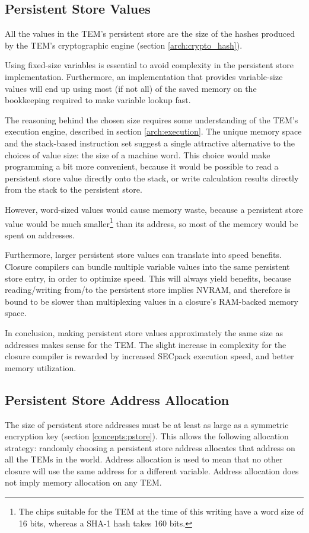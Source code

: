 \subsection{Persistent Store Values}
All the values in the TEM's persistent store are the size of the hashes
produced by the TEM's cryptographic engine (section \ref{arch:crypto_hash}).

Using fixed-size variables is essential to avoid complexity in the persistent
store implementation. Furthermore, an implementation that provides
variable-size values will end up using most (if not all) of the saved memory on
the bookkeeping required to make variable lookup fast.

The reasoning behind the chosen size requires some understanding of the TEM's
execution engine, described in section \ref{arch:execution}. The unique memory
space and the stack-based instruction set suggest a single attractive
alternative to the choices of value size: the size of a machine word. This
choice would make programming a bit more convenient, because it would be
possible to read a persistent store value directly onto the stack, or write
calculation results directly from the stack to the persistent store.

However, word-sized values  would cause memory waste, because a persistent
store value would be much smaller\footnote{The chips suitable for the TEM at
the time of this writing have a word size of 16 bits, whereas a SHA-1 hash
takes 160 bits.} than its address, so most of the memory would be spent on
addresses.

Furthermore, larger persistent store values can translate into speed benefits.
Closure compilers can bundle multiple variable values into the same persistent
store entry, in order to optimize speed. This will always yield benefits,
because reading/writing from/to the persistent store implies NVRAM, and
therefore is bound to be slower than multiplexing values in a closure's
RAM-backed memory space.

In conclusion, making persistent store values approximately the same size
as addresses makes sense for the TEM. The slight increase in complexity for the
closure compiler is rewarded by increased SECpack execution speed, and
better memory utilization.

\subsection{Persistent Store Address Allocation}\label{arch:ps_alloc}
The size of persistent store addresses must be at least as large as a symmetric
encryption key (section \ref{concepts:pstore}). This allows the following
allocation strategy: randomly choosing a persistent store address allocates that
address on all the TEMs in the world. Address allocation is used to mean that
no other closure will use the same address for a different variable. Address
allocation does not imply memory allocation on any TEM.

